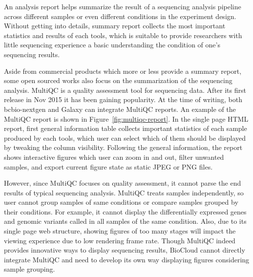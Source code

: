 An analysis report helps summarize the result of a sequencing analysis pipeline
across different samples or even different conditions in the experiment design.
Without getting into details, summary report collects the most important
statistics and results of each tools, which is suitable to provide researchers
with little sequencing experience a basic understanding the condition of one's
sequencing results.

Aside from commercial products which more or less provide a summary report,
some open sourced works also focus on the summarization of the sequencing
analysis. MultiQC \cite{ewels2016:multiqc} is a quality assessment tool for
sequencing data. After its first release in Nov 2015 it has been gaining
popularity. At the time of writing, both bcbio-nextgen and Galaxy can integrate
MultiQC reports. An example of the MultiQC report is shown in
Figure~\ref{fig:multiqc-report}. In the single page HTML report, first general
information table collects important statistics of each sample produced by each
tools, which user can select which of them should be displayed by tweaking the
column visibility. Following the general information, the report shows
interactive figures which user can zoom in and out, filter unwanted samples,
and export current figure state as static JPEG or PNG files.

However, since MultiQC focuses on quality assessment, it cannot parse the end
results of typical sequencing analysis. MultiQC treats samples independently,
so user cannot group samples of same conditions or compare samples grouped by
their conditions. For example, it cannot display the differentially expressed
genes and genomic variants called in all samples of the same condition. Also,
due to its single page web structure, showing figures of too many stages will
impact the viewing experience due to low rendering frame rate. Though MultiQC
indeed provides innovative ways to display sequencing results, BioCloud cannot
directly integrate MultiQC and need to develop its own way displaying figures
considering sample grouping.



